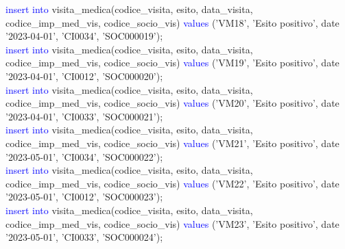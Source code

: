 \documentclass{article}
\begin{document}
\begin{flushleft}
{        \vspace{2mm}
        \hspace*{0.5em}\textcolor{blue}{insert into} visita\_medica(codice\_visita, esito, data\_visita, codice\_imp\_med\_vis, \hspace*{0.5em}codice\_socio\_vis) \textcolor{blue}{values} ('VM18', 'Esito positivo', date '2023-04-01', 'CI0034', \hspace*{0.5em}'SOC000019'); \\
        \vspace{2mm}
        \hspace*{0.5em}\textcolor{blue}{insert into} visita\_medica(codice\_visita, esito, data\_visita, codice\_imp\_med\_vis, \hspace*{0.5em}codice\_socio\_vis) \textcolor{blue}{values} ('VM19', 'Esito positivo', date '2023-04-01', 'CI0012', \hspace*{0.5em}'SOC000020'); \\
        \vspace{2mm}
        \hspace*{0.5em}\textcolor{blue}{insert into} visita\_medica(codice\_visita, esito, data\_visita, codice\_imp\_med\_vis, \hspace*{0.5em}codice\_socio\_vis) \textcolor{blue}{values} ('VM20', 'Esito positivo', date '2023-04-01', 'CI0033', \hspace*{0.5em}'SOC000021'); \\
        \vspace{2mm}
        \hspace*{0.5em}\textcolor{blue}{insert into} visita\_medica(codice\_visita, esito, data\_visita, codice\_imp\_med\_vis, \hspace*{0.5em}codice\_socio\_vis) \textcolor{blue}{values} ('VM21', 'Esito positivo', date '2023-05-01', 'CI0034', \hspace*{0.5em}'SOC000022'); \\
        \vspace{2mm}
        \hspace*{0.5em}\textcolor{blue}{insert into} visita\_medica(codice\_visita, esito, data\_visita, codice\_imp\_med\_vis, \hspace*{0.5em}codice\_socio\_vis) \textcolor{blue}{values} ('VM22', 'Esito positivo', date '2023-05-01', 'CI0012', \hspace*{0.5em}'SOC000023'); \\
        \vspace{2mm}
        \hspace*{0.5em}\textcolor{blue}{insert into} visita\_medica(codice\_visita, esito, data\_visita, codice\_imp\_med\_vis, \hspace*{0.5em}codice\_socio\_vis) \textcolor{blue}{values} ('VM23', 'Esito positivo', date '2023-05-01', 'CI0033', \hspace*{0.5em}'SOC000024'); \\
}
\end{flushleft}
\end{document}
